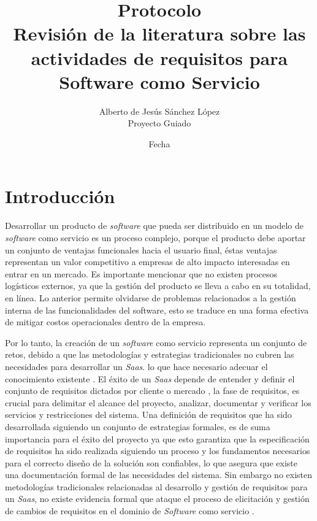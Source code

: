 \documentclass{article}
\begin{document}
  \title{%
  Protocolo \\
  \large Revisión de la literatura sobre las actividades de requisitos para Software como Servicio\\}
  \author{Alberto de Jesús Sánchez López \\ 
  \small Proyecto Guiado}
  \date{Fecha}
  \maketitle
  \thispagestyle{empty}
  \newpage

  \tableofcontents
  \thispagestyle{empty}
  \newpage

\setcounter{page}{1}
\section{Introducción}
Desarrollar un producto de \emph{software} que pueda ser distribuido en un modelo de \emph{software} como servicio 
es un proceso complejo, porque el  producto debe aportar un conjunto de ventajas funcionales hacia el usuario final, 
éstas ventajas representan un valor competitivo a empresas de alto impacto interesadas en entrar en un mercado. Es importante 
mencionar que no existen procesos logísticos externos, ya que la gestión del producto se lleva a cabo en su totalidad, en línea.
Lo anterior permite olvidarse de problemas relacionados a la gestión interna de las funcionalidades del software, 
esto se traduce en una forma efectiva de mitigar costos operacionales dentro de la empresa. 

Por lo tanto, la creación de un \emph{software} como servicio representa un conjunto de retos, debido a que las 
metodologías y estrategias tradicionales no cubren las necesidades para desarrollar un \emph{Saas}. lo que hace necesario adecuar el conocimiento 
existente \cite{wanderley2017requirements}. El éxito de un \emph{Saas} depende de entender y definir el conjunto de requisitos dictados por cliente o mercado \cite{4960886}, 
la fase de requisitos, es crucial para delimitar el alcance del proyecto, analizar, documentar y verificar los servicios y restricciones del sistema. 
Una definición de requisitos que ha sido desarrollada siguiendo un conjunto de estrategias formales,  
es de suma importancia para el éxito del proyecto \cite{6530271} ya que esto garantiza que la especificación de requisitos ha sido 
realizada siguiendo un proceso y los fundamentos necesarios para el correcto diseño de la solución son confiables,
lo que asegura que existe una documentación formal de las necesidades del sistema.
Sin embargo no existen metodologías tradicionales relacionadas al desarrollo y gestión de requisitos para un \emph{Saas}, no existe evidencia 
formal que ataque el proceso de elicitación y gestión de cambios de requisitos en el dominio de \emph{Software} como servicio \cite{7037656}. 
\end{document}
